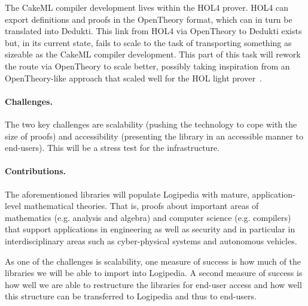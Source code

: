 \medskip

The CakeML compiler development lives within the HOL4 prover. HOL4 can
export definitions and proofs in the OpenTheory format, which can in
turn be translated into Dedukti. This link from HOL4 via OpenTheory to
Dedukti exists but, in its current state, fails to scale to the task
of transporting something as sizeable as the CakeML compiler
development. This part of this task will rework the route via
OpenTheory to scale better, possibly taking inspiration from an
OpenTheory-like approach that scaled well for the HOL light
prover~\cite{KaliszykK13}.


\paragraph*{Challenges.}
The two key challenges are scalability (pushing the technology to cope
with the size of proofs) and accessibility (presenting the library in
an accessible manner to end-users). This will be a stress test for the
infrastructure.

\paragraph*{Contributions.}
The aforementioned libraries will populate Logipedia with mature,
application-level mathematical theories. That is, proofs about
important areas of mathematics (e.g. analysis and algebra) and
computer science (e.g. compilers) that support applications in
engineering as well as security and in particular in interdisciplinary
areas such as cyber-physical systems and autonomous vehicles.

As one of the challenges is scalability, one measure of success is how
much of the libraries we will be able to import into Logipedia. A
second measure of success is how well we are able to restructure the
libraries for end-user access and how well this structure can be
transferred to Logipedia and thus to end-users.


